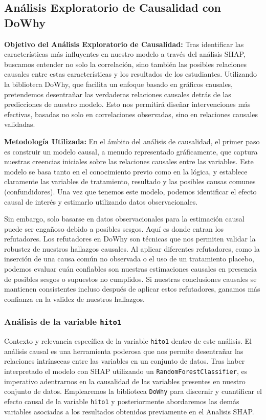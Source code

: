 
\subsection{Análisis Exploratorio de Causalidad con DoWhy}

\textbf{Objetivo del Análisis Exploratorio de Causalidad:} Tras identificar las características más influyentes en nuestro modelo a través del análisis SHAP, buscamos entender no solo la correlación, sino también las posibles relaciones causales entre estas características y los resultados de los estudiantes. Utilizando la biblioteca DoWhy, que facilita un enfoque basado en gráficos causales, pretendemos desentrañar las verdaderas relaciones causales detrás de las predicciones de nuestro modelo. Esto nos permitirá diseñar intervenciones más efectivas, basadas no solo en correlaciones observadas, sino en relaciones causales validadas.

\textbf{Metodología Utilizada:} En el ámbito del análisis de causalidad, el primer paso es construir un modelo causal, a menudo representado gráficamente, que captura nuestras creencias iniciales sobre las relaciones causales entre las variables. Este modelo se basa tanto en el conocimiento previo como en la lógica, y establece claramente las variables de tratamiento, resultado y las posibles causas comunes (confundidores). Una vez que tenemos este modelo, podemos identificar el efecto causal de interés y estimarlo utilizando datos observacionales.

Sin embargo, solo basarse en datos observacionales para la estimación causal puede ser engañoso debido a posibles sesgos. Aquí es donde entran los refutadores. Los refutadores en DoWhy son técnicas que nos permiten validar la robustez de nuestros hallazgos causales. Al aplicar diferentes refutadores, como la inserción de una causa común no observada o el uso de un tratamiento placebo, podemos evaluar cuán confiables son nuestras estimaciones causales en presencia de posibles sesgos o supuestos no cumplidos. Si nuestras conclusiones causales se mantienen consistentes incluso después de aplicar estos refutadores, ganamos más confianza en la validez de nuestros hallazgos.

\subsubsection{Análisis de la variable \texttt{hito1}}
Contexto y relevancia específica de la variable \texttt{hito1} dentro de este análisis.
El análisis causal es una herramienta poderosa que nos permite desentrañar las relaciones intrínsecas entre las variables en un conjunto de datos. Tras haber interpretado el modelo con SHAP utilizando un \texttt{RandomForestClassifier}, es imperativo adentrarnos en la causalidad de las variables presentes en nuestro conjunto de datos. Emplearemos la biblioteca \texttt{DoWhy} para discernir y cuantificar el efecto causal de la variable \texttt{hito1} y posteriormente abordaremos las demás variables asociadas a los resultados obtenidos previamente en el Analisis SHAP.

